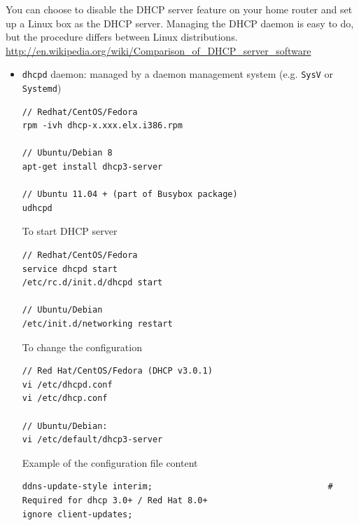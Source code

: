 You can choose to disable the DHCP server feature on your home router and set up
a Linux box as the DHCP server. Managing the DHCP daemon is easy to do, but the
procedure differs between Linux distributions.
\url{http://en.wikipedia.org/wiki/Comparison_of_DHCP_server_software}
\begin{itemize}
  \item \verb!dhcpd! daemon: managed by a daemon management system (e.g.
  \verb!SysV! or \verb!Systemd!)
\begin{verbatim}
// Redhat/CentOS/Fedora
rpm -ivh dhcp-x.xxx.elx.i386.rpm

// Ubuntu/Debian 8
apt-get install dhcp3-server 

// Ubuntu 11.04 + (part of Busybox package)
udhcpd 
\end{verbatim}
  
  To start DHCP server
\begin{verbatim}
// Redhat/CentOS/Fedora
service dhcpd start 
/etc/rc.d/init.d/dhcpd start

// Ubuntu/Debian
/etc/init.d/networking restart
\end{verbatim}
  
  To change the configuration
\begin{verbatim}
// Red Hat/CentOS/Fedora (DHCP v3.0.1)
vi /etc/dhcpd.conf
vi /etc/dhcp.conf  

// Ubuntu/Debian: 
vi /etc/default/dhcp3-server

\end{verbatim}


Example of the configuration file content
\begin{verbatim}
ddns-update-style interim;                                   # Required for dhcp 3.0+ / Red Hat 8.0+
ignore client-updates;


\end{verbatim}
\end{itemize}
